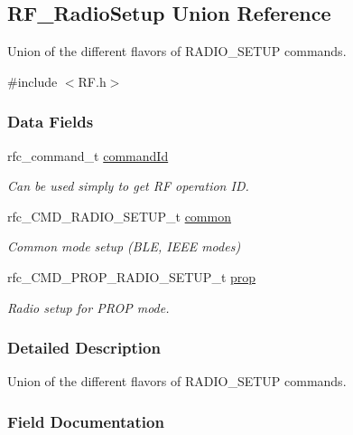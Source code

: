 \subsection{R\+F\+\_\+\+Radio\+Setup Union Reference}
\label{union_r_f___radio_setup}


Union of the different flavors of R\+A\+D\+I\+O\+\_\+\+S\+E\+T\+U\+P commands.  




{\ttfamily \#include $<$R\+F.\+h$>$}

\subsubsection*{Data Fields}
\begin{DoxyCompactItemize}
\item 
rfc\+\_\+command\+\_\+t \hyperlink{union_r_f___radio_setup_a7849a5bb5dc28c798cc55793f6c347dd}{command\+Id}
\begin{DoxyCompactList}\small\item\em Can be used simply to get R\+F operation I\+D. \end{DoxyCompactList}\item 
rfc\+\_\+\+C\+M\+D\+\_\+\+R\+A\+D\+I\+O\+\_\+\+S\+E\+T\+U\+P\+\_\+t \hyperlink{union_r_f___radio_setup_afd03d9690df15d5cca3e82c4ff25ba58}{common}
\begin{DoxyCompactList}\small\item\em Common mode setup (B\+L\+E, I\+E\+E\+E modes) \end{DoxyCompactList}\item 
rfc\+\_\+\+C\+M\+D\+\_\+\+P\+R\+O\+P\+\_\+\+R\+A\+D\+I\+O\+\_\+\+S\+E\+T\+U\+P\+\_\+t \hyperlink{union_r_f___radio_setup_afd693ac0735adf77800aa285124bd03a}{prop}
\begin{DoxyCompactList}\small\item\em Radio setup for P\+R\+O\+P mode. \end{DoxyCompactList}\end{DoxyCompactItemize}


\subsubsection{Detailed Description}
Union of the different flavors of R\+A\+D\+I\+O\+\_\+\+S\+E\+T\+U\+P commands. 

\subsubsection{Field Documentation}
